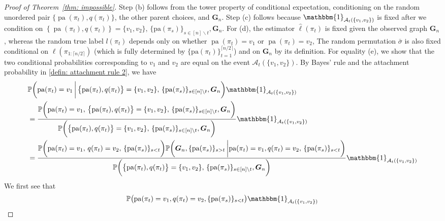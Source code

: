 \documentclass[twoside,11pt]{article}
\theoremstyle{remark}
\begin{document}
\begin{proof}[Proof of Theorem~\ref{thm: impossible}]
Step (b) follows from the tower property of conditional expectation, conditioning on the random unordered pair $\{\operatorname{pa}(\pi_t),q(\pi_t)\}$, the other parent choices, and $\bm G_n$. Step (c) follows because $\mathbbm{1}_{\mathcal{A}_t(\{v_1, v_2\})}$ is fixed after we condition on $\left\{\operatorname{pa}(\pi_t), q(\pi_t)\right\}=\{v_1, v_2\},\, \{\text{pa}(\pi_s)\}_{s \in [n]\backslash{t}}, \bm{G}_n$. 
For (d), the estimator $\hat{\ell}(\pi_t)$ is fixed given the observed graph $\bm{G}_n$, whereas the random true label $l(\pi_t)$ depends only on whether $\operatorname{pa}(\pi_t) = v_1$ or $\operatorname{pa}(\pi_t) = v_2$, 
The random permutation $\bar \sigma$ is also fixed conditional on ${\ell}(\pi_{1: \lceil n/2 \rceil})$ (which is fully determined by $\{\text{pa}(\pi_t)\}_{t=1}^{\lceil n/2 \rceil}$) and on $\bm{G}_n$  by its definition.
For equality (e), we show that the two conditional probabilities corresponding to $v_1$ and $v_2$ are equal on the event $\mathcal{A}_t(\{v_1, v_2\})$.  
By Bayes' rule and the attachment probability in \eqref{defin: attachment rule 2}, we have
%
\begingroup
\begin{align}
&\mathbb{P}\biggl(\text{pa}(\pi_t) = v_1 \,\bigg| \left\{\operatorname{pa}(\pi_t), q(\pi_t)\right\}=\{v_1, v_2\},\, \{\text{pa}(\pi_s)\}_{s \in [n]\backslash{t}}, \bm{G}_n \biggr)\mathbbm{1}_{\mathcal{A}_t(\{v_1, v_2\})} \label{eq:pa_prob_overall} \\
&=\frac{\mathbb{P}\biggl(\text{pa}(\pi_t) = v_1, \, \left\{\operatorname{pa}(\pi_t), q(\pi_t)\right\}=\{v_1, v_2\},\, \{\text{pa}(\pi_s)\}_{s \in [n]\backslash{t}}, \bm{G}_n \biggr)}{\mathbb{P}\biggl(\left\{\operatorname{pa}(\pi_t), q(\pi_t)\right\}=\{v_1, v_2\},\, \{\text{pa}(\pi_s)\}_{s \in [n]\backslash{t}}, \bm{G}_n \biggr)} \mathbbm{1}_{\mathcal{A}_t(\{v_1, v_2\})} \nonumber  \\
%
&=\frac{\mathbb{P}\biggl(\text{pa}(\pi_t) = v_1, \, q(\pi_t)=v_2,\, \{\text{pa}(\pi_s)\}_{s<t}\biggr)\mathbb{P}\biggl(\bm{G}_n, \{\text{pa}(\pi_s)\}_{s>t} \,\bigg| \text{pa}(\pi_t) = v_1, q(\pi_t)=v_2,\, \{\text{pa}(\pi_s)\}_{s<t}\biggr)}{\mathbb{P}\biggl(\left\{\operatorname{pa}(\pi_t), q(\pi_t)\right\}=\{v_1, v_2\},\, \{\text{pa}(\pi_s)\}_{s \in [n]\backslash{t}}, \bm{G}_n \biggr)} \mathbbm{1}_{\mathcal{A}_t(\{v_1, v_2\})} \nonumber
\end{align}
\endgroup
%
We first see that 
\begin{align}
&\mathbb{P}\bigl( \operatorname{pa}(\pi_t) = v_1, q(\pi_t) = v_2, \{ \operatorname{pa}(\pi_s) \}_{s < t} \bigr) \mathbbm{1}_{\mathcal{A}_t(\{v_1, v_2\})}  \nonumber \\

\end{align}
\end{proof}
\end{document}
